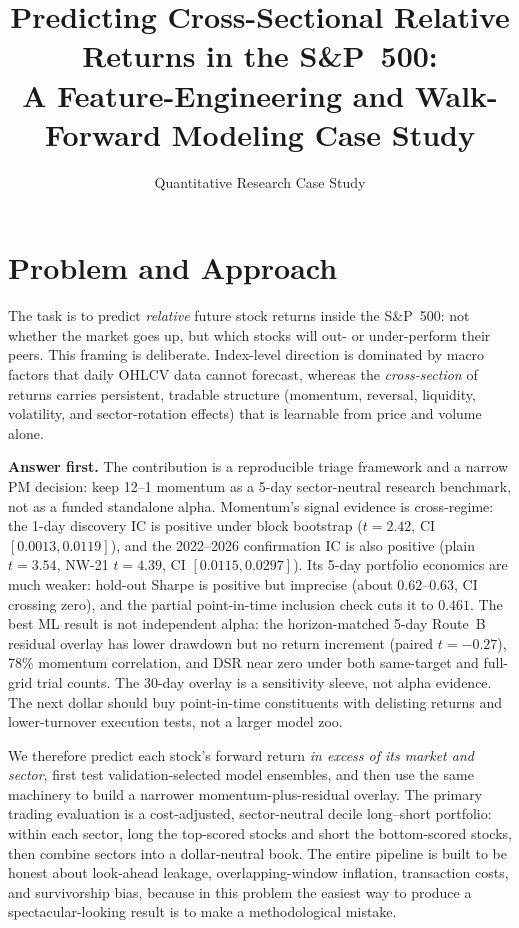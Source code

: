 \documentclass[9pt]{extarticle}
\title{\vspace{-2.5em}Predicting Cross-Sectional Relative Returns in the S\&P~500:\\
A Feature-Engineering and Walk-Forward Modeling Case Study}
\author{Quantitative Research Case Study}
\date{}
\begin{document}
\maketitle
\vspace{-3em}

\section{Problem and Approach}

The task is to predict \emph{relative} future stock returns inside the S\&P~500:
not whether the market goes up, but which stocks will out- or under-perform
their peers. This framing is deliberate. Index-level direction is dominated by
macro factors that daily OHLCV data cannot forecast, whereas the
\emph{cross-section} of returns carries persistent, tradable structure
(momentum, reversal, liquidity, volatility, and sector-rotation effects) that is
learnable from price and volume alone.

\textbf{Answer first.} The contribution is a reproducible triage framework and
a narrow PM decision: keep 12--1 momentum as a 5-day sector-neutral research
benchmark, not as a funded standalone alpha. Momentum's signal evidence is
cross-regime: the 1-day discovery IC is positive under block bootstrap
($t=2.42$, CI $[0.0013,0.0119]$), and the 2022--2026 confirmation IC is also
positive (plain $t=3.54$, NW-21 $t=4.39$, CI $[0.0115,0.0297]$). Its 5-day
portfolio economics are much weaker: hold-out Sharpe is positive but imprecise
(about $0.62$--$0.63$, CI crossing zero), and the partial point-in-time
inclusion check cuts it to $0.461$. The best ML result is not independent alpha:
the horizon-matched 5-day Route~B residual overlay has lower drawdown but no
return increment (paired $t=-0.27$), 78\% momentum correlation, and DSR near
zero under both same-target and full-grid trial counts. The 30-day overlay is a
sensitivity sleeve, not alpha evidence. The next dollar should buy
point-in-time constituents with delisting returns and lower-turnover execution
tests, not a larger model zoo.

We therefore predict each stock's forward return \emph{in excess of its market
and sector}, first test validation-selected model ensembles, and then use the
same machinery to build a narrower momentum-plus-residual overlay. The primary
trading evaluation is a cost-adjusted, sector-neutral decile long--short
portfolio: within each sector, long the top-scored stocks and short the
bottom-scored stocks, then combine sectors into a dollar-neutral book. The
entire pipeline is built to be honest about look-ahead leakage, overlapping-window
inflation, transaction costs, and survivorship bias, because in this problem the
easiest way to produce a spectacular-looking result is to make a methodological
mistake.
\end{document}
